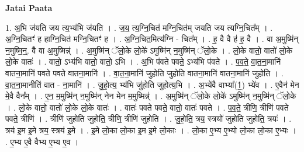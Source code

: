 \documentclass[17pt]{extarticle}
\begin{document}
\textbf{Jatai Paata} \newline

1. अ॒भि ज॑यति जय त्य॒भ्य॑भि ज॑यति । . ज॒य॒ त्य॒ग्नि॒चित॑ मग्नि॒चित॑म् जयति जय त्यग्नि॒चित᳚म् । . अ॒ग्नि॒चितꣳ॑ ह हाग्नि॒चित॑ मग्नि॒चितꣳ॑ ह । . अ॒ग्नि॒चित॒मित्य॑ग्नि - चित᳚म् । . ह॒ वै वै ह॑ ह॒ वै । . वा अ॒मुष्मि॑न् न॒मुष्मि॒न्॒. वै वा अ॒मुष्मिन्न्॑ । . अ॒मुष्मि॑न् ॅलो॒के लो॒के॑ ऽमुष्मि॑न् न॒मुष्मि॑न् ॅलो॒के । . लो॒के वातो॒ वातो॑ लो॒के लो॒के वातः॑ । . वातो॒ ऽभ्य॑भि वातो॒ वातो॒ ऽभि । . अ॒भि प॑वते पवते॒ ऽभ्य॑भि प॑वते । . प॒व॒ते॒ वा॒त॒ना॒मानि॑ वातना॒मानि॑ पवते पवते वातना॒मानि॑ । . वा॒त॒ना॒मानि॑ जुहोति जुहोति वातना॒मानि॑ वातना॒मानि॑ जुहोति । . वा॒त॒ना॒मानीति॑ वात - ना॒मानि॑ । . जु॒हो॒त्य॒ भ्य॑भि जु॑होति जुहोत्य॒भि । . अ॒भ्ये॑वै वाभ्या᳚(1॒) भ्ये॑व । . ए॒वैन॑ मेन मे॒वै वैन᳚म् । . ए॒न॒ म॒मुष्मि॑न् न॒मुष्मि॑न् नेन मेन म॒मुष्मिन्न्॑ । . अ॒मुष्मि॑न् ॅलो॒के लो॒के॑ ऽमुष्मि॑न् न॒मुष्मि॑न् ॅलो॒के । . लो॒के वातो॒ वातो॑ लो॒के लो॒के वातः॑ । . वातः॑ पवते पवते॒ वातो॒ वातः॑ पवते । . प॒व॒ते॒ त्रीणि॒ त्रीणि॑ पवते पवते॒ त्रीणि॑ । . त्रीणि॑ जुहोति जुहोति॒ त्रीणि॒ त्रीणि॑ जुहोति । . जु॒हो॒ति॒ त्रय॒ स्त्रयो॑ जुहोति जुहोति॒ त्रयः॑ । . त्रय॑ इ॒म इ॒मे त्रय॒ स्त्रय॑ इ॒मे । . इ॒मे लो॒का लो॒का इ॒म इ॒मे लो॒काः । . लो॒का ए॒भ्य ए॒भ्यो लो॒का लो॒का ए॒भ्यः । . ए॒भ्य ए॒वै वैभ्य ए॒भ्य ए॒व । \newline
\end{document}
